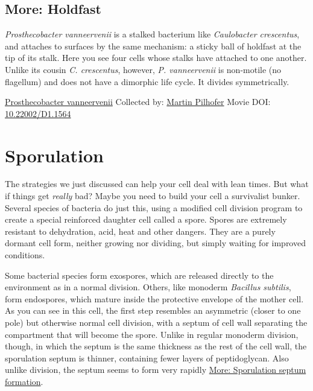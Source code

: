 \documentclass[]{tufte-book}
\begin{document}
\hypertarget{Holdfast}{%
\subsection*{More: Holdfast}\label{Holdfast}}

\emph{Prosthecobacter vanneervenii} is a stalked bacterium like \emph{Caulobacter crescentus}, and attaches to surfaces by the same mechanism: a sticky ball of holdfast at the tip of its stalk. Here you see four cells whose stalks have attached to one another. Unlike its cousin \emph{C. crescentus}, however, \emph{P. vanneervenii} is non-motile (no flagellum) and does not have a dimorphic life cycle. It divides symmetrically.



\hypertarget{htmlwidget-e108ee61a36f6bc98a9a}{}

\label{fig:8-4a}\protect\hyperlink{tree}{Prosthecobacter vanneervenii} Collected by: \protect\hyperlink{martin_pilhofer}{Martin Pilhofer} Movie DOI: \href{https://doi.org/10.22002/D1.1564}{10.22002/D1.1564}

\hypertarget{sporulation}{%
\section{Sporulation}\label{sporulation}}

The strategies we just discussed can help your cell deal with lean times. But what if things get \emph{really} bad? Maybe you need to build your cell a survivalist bunker. Several species of bacteria do just this, using a modified cell division program to create a special reinforced daughter cell called a spore. Spores are extremely resistant to dehydration, acid, heat and other dangers. They are a purely dormant cell form, neither growing nor dividing, but simply waiting for improved conditions.

Some bacterial species form exospores, which are released directly to the environment as in a normal division. Others, like monoderm \emph{Bacillus subtilis}, form endospores, which mature inside the protective envelope of the mother cell. As you can see in this cell, the first step resembles an asymmetric (closer to one pole) but otherwise normal cell division, with a septum of cell wall separating the compartment that will become the spore. Unlike in regular monoderm division, though, in which the septum is the same thickness as the rest of the cell wall, the sporulation septum is thinner, containing fewer layers of peptidoglycan. Also unlike division, the septum seems to form very rapidly \protect\hyperlink{Sporulation_septum_formation}{More: Sporulation septum formation}.
\end{document}
